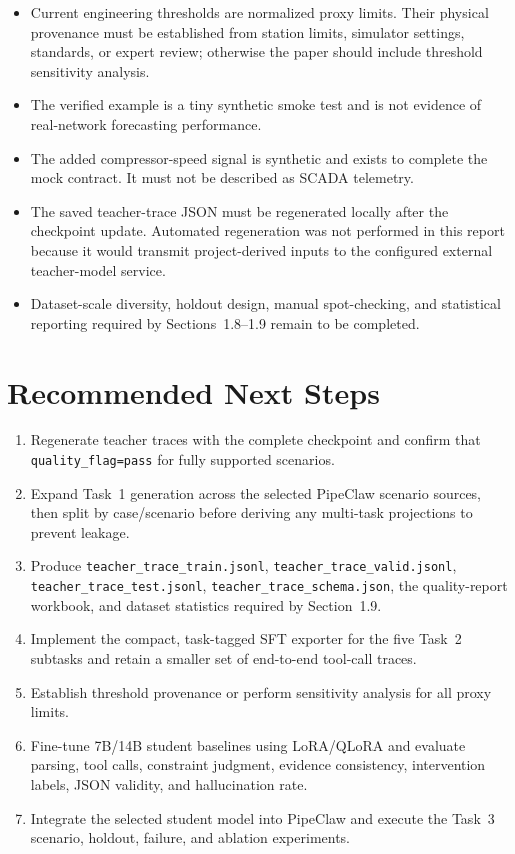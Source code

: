 \documentclass[11pt,a4paper]{article}
\newcommand{\code}[1]{\texttt{#1}}
\begin{document}
\begin{itemize}[leftmargin=*]
  \item Current engineering thresholds are normalized proxy limits. Their physical provenance must be established from station limits, simulator settings, standards, or expert review; otherwise the paper should include threshold sensitivity analysis.
  \item The verified example is a tiny synthetic smoke test and is not evidence of real-network forecasting performance.
  \item The added compressor-speed signal is synthetic and exists to complete the mock contract. It must not be described as SCADA telemetry.
  \item The saved teacher-trace JSON must be regenerated locally after the checkpoint update. Automated regeneration was not performed in this report because it would transmit project-derived inputs to the configured external teacher-model service.
  \item Dataset-scale diversity, holdout design, manual spot-checking, and statistical reporting required by Sections~1.8--1.9 remain to be completed.
\end{itemize}

\section{Recommended Next Steps}

\begin{enumerate}[leftmargin=*]
  \item Regenerate teacher traces with the complete checkpoint and confirm that \code{quality\_flag=pass} for fully supported scenarios.
  \item Expand Task~1 generation across the selected PipeClaw scenario sources, then split by case/scenario before deriving any multi-task projections to prevent leakage.
  \item Produce \code{teacher\_trace\_train.jsonl}, \code{teacher\_trace\_valid.jsonl}, \code{teacher\_trace\_test.jsonl}, \code{teacher\_trace\_schema.json}, the quality-report workbook, and dataset statistics required by Section~1.9.
  \item Implement the compact, task-tagged SFT exporter for the five Task~2 subtasks and retain a smaller set of end-to-end tool-call traces.
  \item Establish threshold provenance or perform sensitivity analysis for all proxy limits.
  \item Fine-tune 7B/14B student baselines using LoRA/QLoRA and evaluate parsing, tool calls, constraint judgment, evidence consistency, intervention labels, JSON validity, and hallucination rate.
  \item Integrate the selected student model into PipeClaw and execute the Task~3 scenario, holdout, failure, and ablation experiments.
\end{enumerate}
\end{document}
